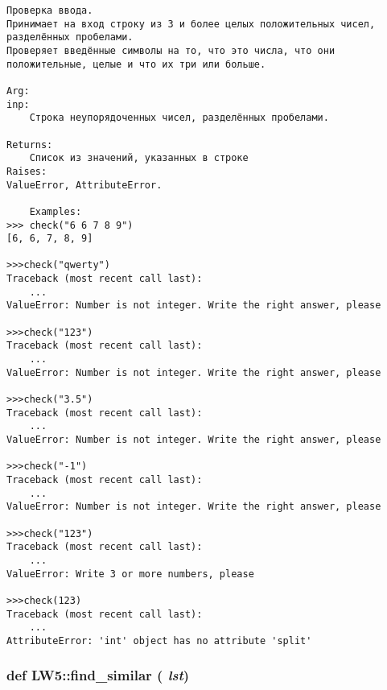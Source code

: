 \footnotesize\begin{verbatim}
Проверка ввода.
Принимает на вход строку из 3 и более целых положительных чисел, разделённых пробелами.
Проверяет введённые символы на то, что это числа, что они положительные, целые и что их три или больше.

Arg:
inp:
    Строка неупорядоченных чисел, разделённых пробелами.

Returns:
    Список из значений, указанных в строке
Raises:
ValueError, AttributeError.

    Examples:
>>> check("6 6 7 8 9")
[6, 6, 7, 8, 9]

>>>check("qwerty")
Traceback (most recent call last):
    ...
ValueError: Number is not integer. Write the right answer, please

>>>check("123")
Traceback (most recent call last):
    ...
ValueError: Number is not integer. Write the right answer, please

>>>check("3.5")
Traceback (most recent call last):
    ...
ValueError: Number is not integer. Write the right answer, please

>>>check("-1")
Traceback (most recent call last):
    ...
ValueError: Number is not integer. Write the right answer, please

>>>check("123")
Traceback (most recent call last):
    ...
ValueError: Write 3 or more numbers, please

>>>check(123)
Traceback (most recent call last):
    ...
AttributeError: 'int' object has no attribute 'split'
\end{verbatim}
\normalsize
 \hypertarget{namespace_l_w5_67083ef6b26830cf508d5705c82f44f7}{
\subsubsection[{find\_\-similar}]{\setlength{\rightskip}{0pt plus 5cm}def LW5::find\_\-similar ( {\em lst})}}
\label{namespace_l_w5_67083ef6b26830cf508d5705c82f44f7}




